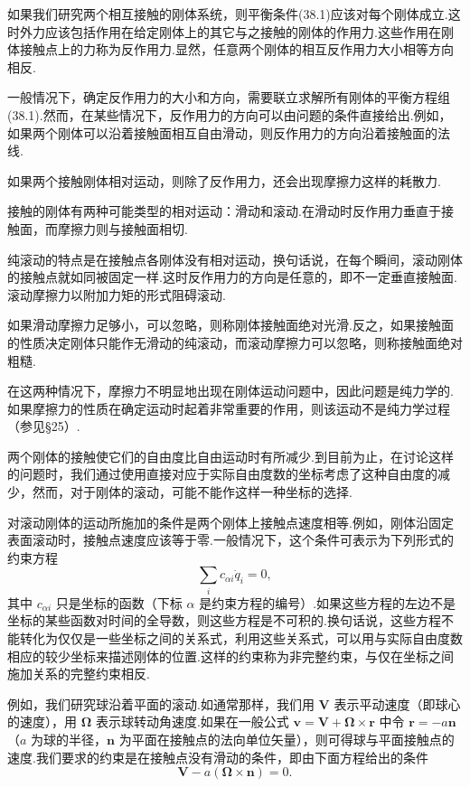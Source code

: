 如果我们研究两个相互接触的刚体系统，则平衡条件(38.1)应该对每个刚体成立.这时外力应该包括作用在给定刚体上的其它与之接触的刚体的作用力.这些作用在刚体接触点上的力称为反作用力.显然，任意两个刚体的相互反作用力大小相等方向相反.

一般情况下，确定反作用力的大小和方向，需要联立求解所有刚体的平衡方程组(38.1).然而，在某些情况下，反作用力的方向可以由问题的条件直接给出.例如，如果两个刚体可以沿着接触面相互自由滑动，则反作用力的方向沿着接触面的法线.

如果两个接触刚体相对运动，则除了反作用力，还会出现摩擦力这样的耗散力.

接触的刚体有两种可能类型的相对运动：滑动和滚动.在滑动时反作用力垂直于接触面，而摩擦力则与接触面相切.

纯滚动的特点是在接触点各刚体没有相对运动，换句话说，在每个瞬间，滚动刚体的接触点就如同被固定一样.这时反作用力的方向是任意的，即不一定垂直接触面.滚动摩擦力以附加力矩的形式阻碍滚动.

如果滑动摩擦力足够小，可以忽略，则称刚体接触面绝对光滑.反之，如果接触面的性质决定刚体只能作无滑动的纯滚动，而滚动摩擦力可以忽略，则称接触面绝对粗糙.

在这两种情况下，摩擦力不明显地出现在刚体运动问题中，因此问题是纯力学的.如果摩擦力的性质在确定运动时起着非常重要的作用，则该运动不是纯力学过程（参见§25）.

两个刚体的接触使它们的自由度比自由运动时有所减少.到目前为止，在讨论这样的问题时，我们通过使用直接对应于实际自由度数的坐标考虑了这种自由度的减少，然而，对于刚体的滚动，可能不能作这样一种坐标的选择.

对滚动刚体的运动所施加的条件是两个刚体上接触点速度相等.例如，刚体沿固定表面滚动时，接触点速度应该等于零.一般情况下，这个条件可表示为下列形式的约束方程
\begin{equation}
  \sum_i c_{\alpha i}\dot{q}_i=0,
\end{equation}
其中 $c_{\alpha i}$ 只是坐标的函数（下标 $\alpha$ 是约束方程的编号）.如果这些方程的左边不是坐标的某些函数对时间的全导数，则这些方程是不可积的.换句话说，这些方程不能转化为仅仅是一些坐标之间的关系式，利用这些关系式，可以用与实际自由度数相应的较少坐标来描述刚体的位置.这样的约束称为非完整约束，与仅在坐标之间施加关系的完整约束相反.

例如，我们研究球沿着平面的滚动.如通常那样，我们用 $\boldsymbol{V}$ 表示平动速度（即球心的速度），用 $\boldsymbol{\Omega}$ 表示球转动角速度.如果在一般公式
$\boldsymbol{v}=\boldsymbol{V}+\boldsymbol{\Omega}\times\boldsymbol{r}$
中令 $\boldsymbol{r}=-a\boldsymbol{n}$（$a$ 为球的半径，$\boldsymbol{n}$ 为平面在接触点的法向单位矢量），则可得球与平面接触点的速度.我们要求的约束是在接触点没有滑动的条件，即由下面方程给出的条件
\begin{equation}
  \boldsymbol{V}-a\left(\boldsymbol{\Omega}\times\boldsymbol{n}\right)=0.
\end{equation}

